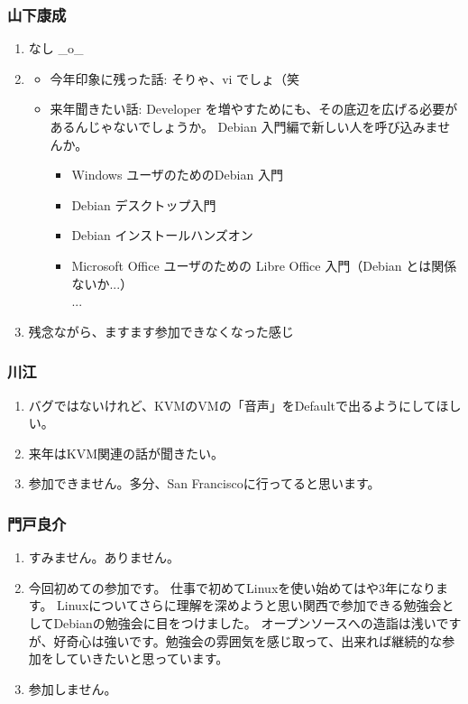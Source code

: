 \documentclass[cjk,dvipdfmx,10pt,%
hyperref={bookmarks=true,bookmarksnumbered=true,bookmarksopen=false,%
colorlinks=false,%
pdftitle={第 54 回 関西 Debian 勉強会},%
pdfauthor={倉敷・のがた・佐々木},%
pdfsubject={資料},%
}]{beamer}
\begin{document}
\begin{frame}[fragile]
\frametitle{ 山下康成 }
  \begin{enumerate}
  \item なし \_o\_
  \item
    \begin{itemize}
    \item 今年印象に残った話: そりゃ、vi でしょ（笑
    \item 来年聞きたい話:
      Developer を増やすためにも、その底辺を広げる必要があるんじゃないでしょうか。
      Debian 入門編で新しい人を呼び込みませんか。
      \begin{itemize}
      \item Windows ユーザのためのDebian 入門
      \item Debian デスクトップ入門
      \item Debian インストールハンズオン
      \item Microsoft Office ユーザのための Libre Office 入門（Debian とは関係ないか...）
        \\ ...
      \end{itemize}
    \end{itemize}
  \item 残念ながら、ますます参加できなくなった感じ
  \end{enumerate}
\end{frame}

\begin{frame}[fragile]
\frametitle{ 川江 }
  \begin{enumerate}
  \item バグではないけれど、KVMのVMの「音声」をDefaultで出るようにしてほしい。
  \item 来年はKVM関連の話が聞きたい。
  \item 参加できません。多分、San Franciscoに行ってると思います。
  \end{enumerate}
\end{frame}

\begin{frame}[fragile]
\frametitle{ 門戸良介 }
  \begin{enumerate}
  \item すみません。ありません。
  \item
    今回初めての参加です。
    仕事で初めてLinuxを使い始めてはや3年になります。
    Linuxについてさらに理解を深めようと思い関西で参加できる勉強会としてDebianの勉強会に目をつけました。
    オープンソースへの造詣は浅いですが、好奇心は強いです。勉強会の雰囲気を感じ取って、出来れば継続的な参加をしていきたいと思っています。
  \item
    参加しません。
  \end{enumerate}
\end{frame}
\end{document}
